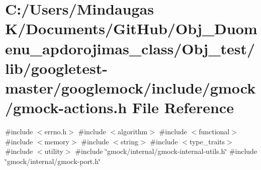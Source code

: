 \hypertarget{_obj__test_2lib_2googletest-master_2googlemock_2include_2gmock_2gmock-actions_8h}{}\section{C\+:/\+Users/\+Mindaugas K/\+Documents/\+Git\+Hub/\+Obj\+\_\+\+Duomenu\+\_\+apdorojimas\+\_\+class/\+Obj\+\_\+test/lib/googletest-\/master/googlemock/include/gmock/gmock-\/actions.h File Reference}
\label{_obj__test_2lib_2googletest-master_2googlemock_2include_2gmock_2gmock-actions_8h}
{\ttfamily \#include $<$errno.\+h$>$}\newline
{\ttfamily \#include $<$algorithm$>$}\newline
{\ttfamily \#include $<$functional$>$}\newline
{\ttfamily \#include $<$memory$>$}\newline
{\ttfamily \#include $<$string$>$}\newline
{\ttfamily \#include $<$type\+\_\+traits$>$}\newline
{\ttfamily \#include $<$utility$>$}\newline
{\ttfamily \#include \char`\"{}gmock/internal/gmock-\/internal-\/utils.\+h\char`\"{}}\newline
{\ttfamily \#include \char`\"{}gmock/internal/gmock-\/port.\+h\char`\"{}}\newline
